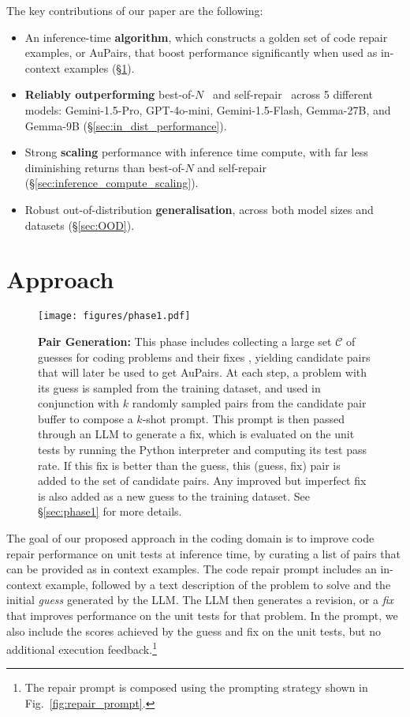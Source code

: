 \documentclass[11pt, a4paper, logo, copyright]{googledeepmind}
\def\aupairs/{\textcolor{golden}{Au}Pairs}
\newcommand*{\inimg}[1]{
    \raisebox{-.2\baselineskip}{
        \texttt{[image: \#1]}
    }
}
\newcommand*{\inbigimg}[1]{
    \raisebox{-.2\baselineskip}{
        \texttt{[image: \#1]}
    }
}
\begin{document}
The key contributions of our paper are the following:
\begin{itemize}
    \item An inference-time {\bf algorithm}, which constructs a \textcolor{golden}{golden} set of code repair examples, or \aupairs/, that boost performance significantly when used as in-context examples (\S\ref{sec:approach}).
    \item {\bf Reliably outperforming} best-of-$N$~\citep{best-of-n} and self-repair~\citep{olausson2024self} across 5 different models: Gemini-1.5-Pro, GPT-4o-mini, Gemini-1.5-Flash, Gemma-27B, and Gemma-9B (\S\ref{sec:in_dist_performance}).
    \item Strong {\bf scaling} performance with inference time compute, with far less diminishing returns than best-of-$N$ and self-repair (\S\ref{sec:inference_compute_scaling}). 
    \item Robust out-of-distribution {\bf generalisation}, across both model sizes and datasets (\S\ref{sec:OOD}).
\end{itemize}


\section{Approach}
\label{sec:approach}

\begin{figure}[t]
    \centering
    \texttt{[image: figures/phase1.pdf]}
    \caption{\textbf{Pair Generation:} This phase includes collecting a large set $\mathcal{C}$ of guesses for coding problems \inimg{figures/guess.png} and their fixes \inimg{figures/fix.png}, yielding candidate pairs \inbigimg{figures/pair.png} that will later be used to get \aupairs/. At each step, a problem with its guess is sampled from the training dataset, and used in conjunction with $k$ randomly sampled pairs from the candidate pair buffer to compose a $k$-shot prompt. This prompt is then passed through an LLM to generate a fix, which is evaluated on the unit tests by running the Python interpreter and computing its test pass rate. If this fix is better than the guess, this (guess, fix) pair is added to the set of candidate pairs. Any improved but imperfect fix is also added as a new guess to the training dataset. See \S\ref{sec:phase1} for more details.}
    \label{fig:phase1}
\end{figure}

The goal of our proposed approach in the coding domain is to improve code repair performance on unit tests at inference time, by curating a list of pairs that can be provided as in context examples. The code repair prompt includes an in-context example, followed by a text description of the problem to solve and the initial \emph{guess} generated by the LLM. The LLM then generates a revision, or a \emph{fix} that improves performance on the unit tests for that problem. In the prompt, we also include the scores achieved by the guess and fix on the unit tests, but no additional execution feedback.\footnote{The repair prompt is composed using the prompting strategy shown in Fig.~\ref{fig:repair_prompt}.}
\end{document}

